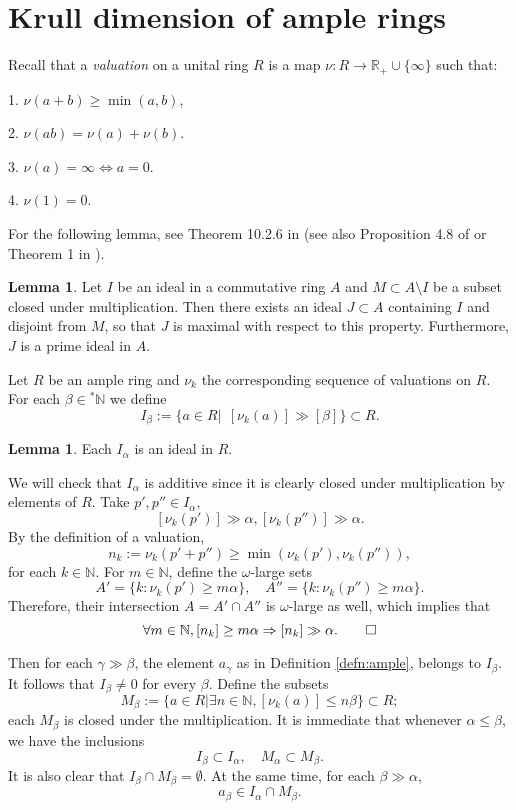 \documentclass{amsproc}
\theoremstyle{definition}
\newtheorem{lemma}[theorem]{Lemma}
\theoremstyle{definition}
\theoremstyle{remark}
\begin{document}
\section{Krull dimension of ample rings}

 
\noindent Recall  that a {\em valuation} on a unital ring $R$ is a map $\nu: R\to {{\mathbb R}}_+\cup \{\infty\}$ such that:

1. $\nu(a+b)\ge \min(a, b)$,

2. $\nu(ab)=\nu(a)+\nu(b)$. 

3. $\nu(a)=\infty \iff a=0$. 

4. $\nu(1)=0$.  

\noindent For the following lemma, see  Theorem 10.2.6 in \cite{Cohn} (see also Proposition 4.8 of \cite{Clark} or Theorem 1 in \cite{Kaplansky}). 

\begin{lemma}\label{L0}
Let $I$ be an ideal in a commutative ring $A$ and $M\subset A\setminus I$ be a subset closed under multiplication. Then there exists an ideal $J\subset A$ containing  $I$ and disjoint from $M$, so that $J$ is maximal with respect to this property. Furthermore, $J$ is a prime ideal in $A$. 
\end{lemma}

Let $R$ be an ample ring and $\nu_k$ the corresponding sequence of valuations on $R$. 
For each ${\beta}\in {{}^{*}{{\mathbb N}}}$ we define 
$$
I_{\beta}:=\{a\in R | ~~ [\nu_k(a)] \gg [{\beta}] \}\subset R. 
$$  

\begin{lemma}\label{lem:add}
Each $I_{\alpha}$ is an ideal in $R$. 
\end{lemma}
{\par\medskip{}} We will check that $I_{\alpha}$ is additive since it is clearly closed under multiplication by elements of $R$. 
Take $p', p''\in I_{\alpha}$,  
$$
[\nu_k(p')]\gg {\alpha}, [\nu_k(p'')] \gg {\alpha}. 
$$
By the definition of a valuation,  
$$
n_k:=\nu_k(p'+ p'') \ge \min( \nu_k(p'), \nu_k(p'')),
$$
for each $k\in {{\mathbb N}}$. For $m\in {{\mathbb N}}$, define the ${\omega}$-large sets 
$$
A'=\{k: \nu_k(p')\ge m {\alpha}\}, \quad A''=\{k: \nu_k(p'')\ge m {\alpha}\}.$$ 
Therefore, their intersection $A=A'\cap A''$ is ${\omega}$-large as well, which implies that 
$$
\forall m\in {{\mathbb N}}, [n_k] \ge m {\alpha} \Rightarrow [n_k] \gg {\alpha}.  \qed 
$$

Then for each ${\gamma} \gg {\beta}$, the element $a_{\gamma}$ as in Definition \ref{defn:ample}, belongs to $I_\beta$.
It follows that $I_{\beta}\ne 0$ for every ${\beta}$. Define the subsets    
$$
M_{\beta}:= \{ a\in R  | \exists n\in {{\mathbb N}}, [\nu_k(a)] \le n {\beta} \}\subset R; 
$$
each $M_{\beta}$ is  closed under the multiplication. It is immediate that whenever ${\alpha}\le {\beta}$, we have the inclusions 
$$
I_{\beta} \subset I_{\alpha} , \quad M_{\alpha}\subset M_{\beta}. 
$$
It is also clear that $I_{\beta} \cap M_{\beta}=\emptyset$. At the same time,  for each 
${\beta} \gg {\alpha}$,
$$
a_\beta\in I_{\alpha} \cap M_\beta. 
$$
\end{document}
